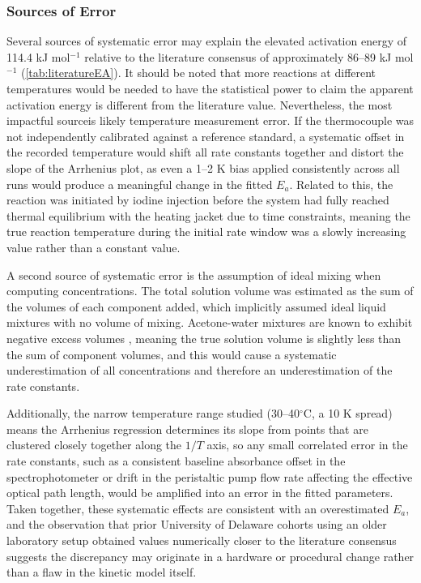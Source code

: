 \documentclass{article}
\begin{document}
\subsubsection{Sources of Error}

Several sources of systematic error may explain the elevated activation energy of 114.4 kJ mol$^{-1}$  relative to the literature consensus of approximately 86--89 kJ mol$^{-1}$ (\cref{tab:literatureEA}). It should be noted that more reactions at different temperatures would be needed to have the statistical power to claim the apparent activation energy is different from the literature value. Nevertheless, the most impactful  sourceis likely temperature measurement error. If the thermocouple was not independently calibrated against a reference standard, a systematic offset in the recorded temperature would shift all rate constants together and distort the slope of the Arrhenius plot, as even a 1--2 K bias applied consistently across all runs would produce a meaningful change in the fitted $E_a$. Related to this, the reaction was initiated by iodine injection before the system had fully reached thermal equilibrium with the heating jacket due to time constraints, meaning the true reaction temperature during the initial rate window was a slowly increasing value rather than a constant value.

A second source of systematic error is the assumption of ideal mixing when computing concentrations. The total solution volume was estimated as the sum of the volumes of each component added, which implicitly assumed ideal liquid mixtures with no volume of mixing. Acetone-water mixtures are known to exhibit negative excess volumes \autocite{shakhashiri, ivanov, kurtzrefractive_1965, jedlovszky}, meaning the true solution volume is slightly less than the sum of component volumes, and this would cause a systematic underestimation of all concentrations and therefore an underestimation of the rate constants. 

Additionally, the narrow temperature range studied (30--40$^\circ$C, a 10 K spread) means the Arrhenius regression determines its slope from points that are clustered closely together along the $1/T$ axis, so any small correlated error in the rate constants, such as a consistent baseline absorbance offset in the spectrophotometer or drift in the peristaltic pump flow rate affecting the effective optical path length, would be amplified into an error in the fitted parameters. Taken together, these systematic effects are consistent with an overestimated $E_a$, and the observation that prior University of Delaware cohorts using an older laboratory setup obtained values numerically closer to the literature consensus suggests the discrepancy may originate in a hardware or procedural change rather than a flaw in the kinetic model itself. 
\end{document}
